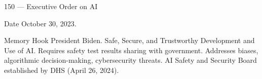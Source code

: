 \documentclass[aspectratio=169,8pt]{beamer}
\begin{document}
	\begin{frame}{150 --- Executive Order on AI}
		\begin{block}{Date}
			October 30, 2023.
		\end{block}
		\begin{block}{Memory Hook}
			President Biden. Safe, Secure, and Trustworthy Development and Use of AI. Requires safety test results sharing with government. Addresses biases, algorithmic decision-making, cybersecurity threats. AI Safety and Security Board established by DHS (April 26, 2024).
		\end{block}
	\end{frame}
	
\end{document}
